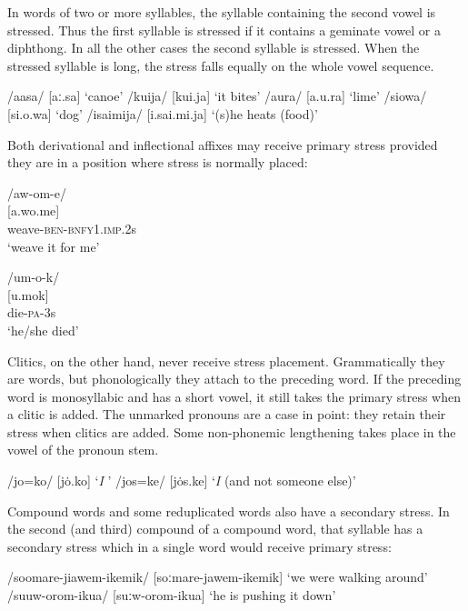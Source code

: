 In words of two or more syllables, the syllable containing the second vowel is stressed. Thus the first syllable is stressed if it contains a geminate vowel or a diphthong. In all the other cases the second syllable is stressed. When the stressed syllable is long, the stress falls equally on the whole vowel sequence. 

\ea
\ea
/aasa/  [{{\textprimstress}aː.sa}]  `canoe'
\ex
/kuija/  [{{\textprimstress}kui.ja}]  `it bites'
\ex
/a{\textphi}ura/  [a.{{\textprimstress}}{\textphi}u.ra]  `lime'
\ex
/siowa/  [si.{{\textprimstress}o.wa}]  `dog'
\ex
/isaimija/  [i.{{\textprimstress}sai.mi.ja}]  `(s)he heats (food)'
\z
\z

Both derivational and inflectional affixes may receive primary stress provided they are in a position where stress is normally placed:

\ea
\ea
  /aw-om-e/\\
  {}[a.{{\textprimstress}wo.me}]  \\
weave-\textsc{ben}-\textsc{bnfy1}.\textsc{imp}.2s\\
\glt `weave it for me' 

\ex
  /um-o-k/ \\
 {}[u.{{\textprimstress}mok}]  \\
die-\textsc{pa}-3s \\
\glt `he/she died'
\z
\z



Clitics, on the other hand, never receive stress placement. Grammatically they are words, but phonologically they attach to the preceding word. If the preceding word is monosyllabic and has a short vowel, it still takes the primary stress when a clitic is added. The unmarked pronouns are a case in point: they retain their stress when clitics are added. Some non-phonemic lengthening takes place in the vowel of the pronoun stem.

\ea
\ea
/jo=ko/  [{{\textprimstress}}jo{\.{}.ko}]  `\textit{I} '
\ex
/jos=ke/  [{{\textprimstress}}jo{\.{}s.ke}]  `\textit{I} (and not someone else)' 
\z
\z

Compound words and some reduplicated words also have a secondary stress.  In the second (and third) compound of a compound word, that syllable has a secondary stress which in a single word would receive primary stress: 

\ea
\ea
/soomare-jiawem-ikemik/  [{{\textprimstress}soːmare-j}{\textsci}{{\textprimstress}}{{\textprimstress}}awem-i{{\textprimstress}}{{\textprimstress}}kemik]  `we were walking around'
\ex
/suuw-orom-ikua/  [{{\textprimstress}}suːw-o{{\textprimstress}}{{\textprimstress}}rom-i{{\textprimstress}}{{\textprimstress}}kua]  `he is pushing it down'
\z
\z

